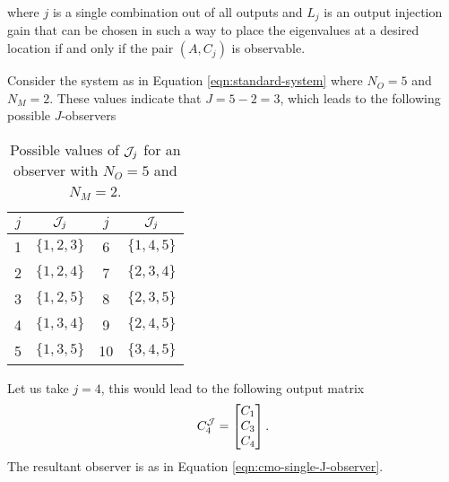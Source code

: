 where $j$ is a single combination out of all outputs and $L_j$ is an output injection gain that can be chosen in such a way to place the eigenvalues at a desired location if and only if the pair $(A,C_j)$ is observable. 
\begin{example}
    Consider the system as in Equation \eqref{eqn:standard-system} where $N_O=5$ and $N_M=2$. These values indicate that $J=5-2=3$, which leads to the following possible $J$-observers 
    \begin{table}[H]
        \centering
        \begin{tabular}{|c|c||c|c|}
            \toprule
            $j$ & $\mathcal{J}_j$ & $j$ & $\mathcal{J}_j$ \\
            \midrule
            1 & $\{1,2,3\}$ & 6 & $\{1,4,5\}$ \\
            2 & $\{1,2,4\}$ & 7 & $\{2,3,4\}$ \\
            3 & $\{1,2,5\}$ & 8 & $\{2,3,5\}$ \\
            4 & $\{1,3,4\}$ & 9 & $\{2,4,5\}$ \\
            5 & $\{1,3,5\}$ & 10 & $\{3,4,5\}$ \\   
            \bottomrule
        \end{tabular}
        \caption{Possible values of $\mathcal{J}_j$ for an observer with $N_O=5$ and $N_M=2$.}
        \label{tab:my_label}
    \end{table}
    Let us take $j=4$, this would lead to the following output matrix
    \begin{equation*}
        C^{\mathcal{J}}_{4} = 
        \begin{bmatrix}
            C_1 \\ C_3 \\ C_4 \\
        \end{bmatrix}.
    \end{equation*}
    The resultant observer is as in Equation \eqref{eqn:cmo-single-J-observer}.
\end{example}

